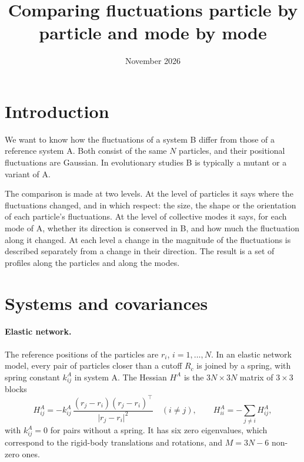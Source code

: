 \documentclass[11pt,a4paper]{article}
\title{Comparing fluctuations particle by particle and mode by mode}
\author{}
\date{November 2026}
\begin{document}
\maketitle

\section{Introduction}

We want to know how the fluctuations of a system B differ from those of a reference system A. Both consist of the same $N$ particles, and their positional fluctuations are Gaussian. In evolutionary studies B is typically a mutant or a variant of A.

The comparison is made at two levels. At the level of particles it says where the fluctuations changed, and in which respect: the size, the shape or the orientation of each particle's fluctuations. At the level of collective modes it says, for each mode of A, whether its direction is conserved in B, and how much the fluctuation along it changed. At each level a change in the magnitude of the fluctuations is described separately from a change in their direction. The result is a set of profiles along the particles and along the modes.

\section{Systems and covariances}

\paragraph{Elastic network.} The reference positions of the particles are $r_i$, $i = 1,\dots,N$. In an elastic network model, every pair of particles closer than a cutoff $R_c$ is joined by a spring, with spring constant $k^A_{ij}$ in system A. The Hessian $H^A$ is the $3N\times3N$ matrix of $3\times3$ blocks
\begin{equation}
H^A_{ij} = -k^A_{ij}\,\frac{(r_j - r_i)(r_j - r_i)^\top}{\lvert r_j - r_i\rvert^2}\quad (i\neq j), \qquad H^A_{ii} = -\sum_{j\neq i} H^A_{ij} ,
\end{equation}
with $k^A_{ij} = 0$ for pairs without a spring. It has six zero eigenvalues, which correspond to the rigid-body translations and rotations, and $M = 3N - 6$ non-zero ones.
\end{document}
